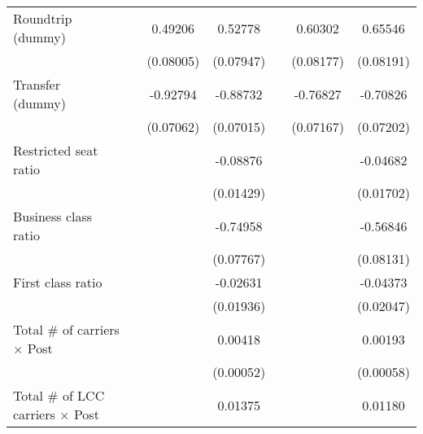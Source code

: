 \begin{table}[htbp]
\begin{tabular}{l*{6}{c}}
\addlinespace
\shortstack{Roundtrip \\ (dummy)}&                     &     0.49206\sym{***}&     0.52778\sym{***}&                     &     0.60302\sym{***}&     0.65546\sym{***}\\
                    &                     &   (0.08005)         &   (0.07947)         &                     &   (0.08177)         &   (0.08191)         \\
\addlinespace
\shortstack{Transfer \\ (dummy)}&                     &    -0.92794\sym{***}&    -0.88732\sym{***}&                     &    -0.76827\sym{***}&    -0.70826\sym{***}\\
                    &                     &   (0.07062)         &   (0.07015)         &                     &   (0.07167)         &   (0.07202)         \\
\addlinespace
Restricted seat ratio&                     &                     &    -0.08876\sym{***}&                     &                     &    -0.04682\sym{***}\\
                    &                     &                     &   (0.01429)         &                     &                     &   (0.01702)         \\
\addlinespace
Business class ratio&                     &                     &    -0.74958\sym{***}&                     &                     &    -0.56846\sym{***}\\
                    &                     &                     &   (0.07767)         &                     &                     &   (0.08131)         \\
\addlinespace
First class ratio   &                     &                     &    -0.02631         &                     &                     &    -0.04373\sym{**} \\
                    &                     &                     &   (0.01936)         &                     &                     &   (0.02047)         \\
\addlinespace
Total # of carriers $\times$ Post&                     &                     &     0.00418\sym{***}&                     &                     &     0.00193\sym{***}\\
                    &                     &                     &   (0.00052)         &                     &                     &   (0.00058)         \\
\addlinespace
Total # of LCC carriers $\times$ Post&                     &                     &     0.01375\sym{***}&                     &                     &     0.01180\sym{***}\\

\end{tabular}
\end{table}
